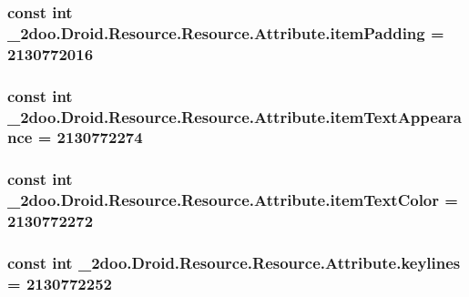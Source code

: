 \hypertarget{class__2doo_1_1_droid_1_1_resource_1_1_attribute_98392cd3635217a34414bd0750d98df7}{
\subsubsection[{itemPadding}]{\setlength{\rightskip}{0pt plus 5cm}const int \_\-2doo.Droid.Resource.Resource.Attribute.itemPadding = 2130772016}}
\label{class__2doo_1_1_droid_1_1_resource_1_1_attribute_98392cd3635217a34414bd0750d98df7}


\hypertarget{class__2doo_1_1_droid_1_1_resource_1_1_attribute_a5900b23c8475bdeb23b89de0e2c1bad}{
\subsubsection[{itemTextAppearance}]{\setlength{\rightskip}{0pt plus 5cm}const int \_\-2doo.Droid.Resource.Resource.Attribute.itemTextAppearance = 2130772274}}
\label{class__2doo_1_1_droid_1_1_resource_1_1_attribute_a5900b23c8475bdeb23b89de0e2c1bad}


\hypertarget{class__2doo_1_1_droid_1_1_resource_1_1_attribute_dcf77c0238221a0fbce30f8fb3aa0407}{
\subsubsection[{itemTextColor}]{\setlength{\rightskip}{0pt plus 5cm}const int \_\-2doo.Droid.Resource.Resource.Attribute.itemTextColor = 2130772272}}
\label{class__2doo_1_1_droid_1_1_resource_1_1_attribute_dcf77c0238221a0fbce30f8fb3aa0407}


\hypertarget{class__2doo_1_1_droid_1_1_resource_1_1_attribute_b40c23a9ac96ca394677273b4d99b6cb}{
\subsubsection[{keylines}]{\setlength{\rightskip}{0pt plus 5cm}const int \_\-2doo.Droid.Resource.Resource.Attribute.keylines = 2130772252}}
\label{class__2doo_1_1_droid_1_1_resource_1_1_attribute_b40c23a9ac96ca394677273b4d99b6cb}


